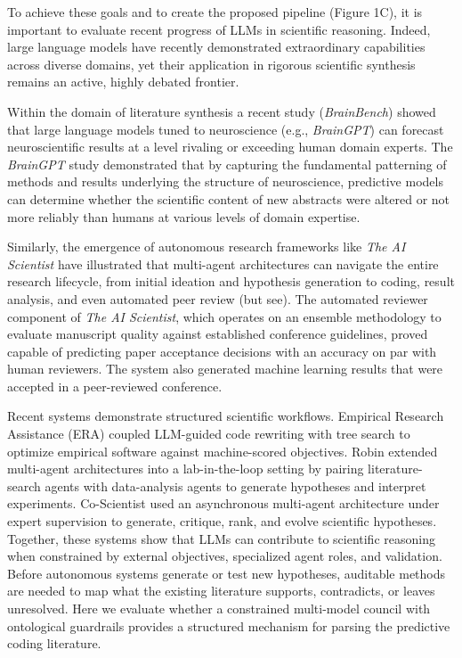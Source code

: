 \documentclass[12pt]{article}
\begin{document}
To achieve these goals and to create the proposed pipeline (Figure 1C), it is important to evaluate recent progress of LLMs in scientific reasoning. Indeed, large language models have recently demonstrated extraordinary capabilities across diverse domains, yet their application in rigorous scientific synthesis remains an active, highly debated frontier\cite{ref5,ref44,ref45,ref46}.

Within the domain of literature synthesis a recent study (\emph{BrainBench}) showed that large language models tuned to neuroscience (e.g., \emph{BrainGPT}) can forecast neuroscientific results at a level rivaling or exceeding human domain experts\cite{ref5}. The \emph{BrainGPT} study demonstrated that by capturing the fundamental patterning of methods and results underlying the structure of neuroscience, predictive models can determine whether the scientific content of new abstracts were altered or not more reliably than humans at various levels of domain expertise\cite{ref5}.

Similarly, the emergence of autonomous research frameworks like \emph{The AI Scientist}\cite{ref45} have illustrated that multi-agent architectures can navigate the entire research lifecycle, from initial ideation and hypothesis generation to coding, result analysis, and even automated peer review (but see\cite{ref47}). The automated reviewer component of \emph{The AI Scientist}, which operates on an ensemble methodology to evaluate manuscript quality against established conference guidelines, proved capable of predicting paper acceptance decisions with an accuracy on par with human reviewers. The system also generated machine learning results that were accepted in a peer-reviewed conference\cite{ref45}.

Recent systems demonstrate structured scientific workflows. Empirical Research Assistance (ERA)\cite{ref48} coupled LLM-guided code rewriting with tree search to optimize empirical software against machine-scored objectives. Robin\cite{ref86} extended multi-agent architectures into a lab-in-the-loop setting by pairing literature-search agents with data-analysis agents to generate hypotheses and interpret experiments. Co-Scientist\cite{ref87} used an asynchronous multi-agent architecture under expert supervision to generate, critique, rank, and evolve scientific hypotheses. Together, these systems show that LLMs can contribute to scientific reasoning when constrained by external objectives, specialized agent roles, and validation. Before autonomous systems generate or test new hypotheses, auditable methods are needed to map what the existing literature supports, contradicts, or leaves unresolved. Here we evaluate whether a constrained multi-model council with ontological guardrails provides a structured mechanism for parsing the predictive coding literature.
\end{document}
